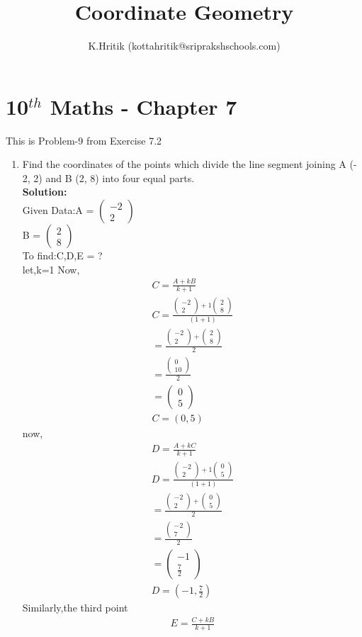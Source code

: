 \documentclass[12pt]{article}
\title{Coordinate Geometry}
\author{K.Hritik (kottahritik@sriprakshschools.com)}
\newcommand{\myvec}[1]{\ensuremath{\begin{pmatrix}#1\end{pmatrix}}}
\newcommand{\solution}{\noindent \textbf{Solution: }}
\begin{document}
\maketitle
\section*{10$^{th}$ Maths - Chapter 7}
This is Problem-9 from Exercise 7.2
\begin{enumerate}
\item Find the coordinates of the points which divide the line segment joining A (- 2, 2) and B (2, 8) into four equal parts.  \\
\solution \\
Given Data:A = \myvec{-2\\2}\\
           B = \myvec{2\\8}\\
To find:C,D,E = ?\\
let,k=1
Now, 
\begin{align}
C = \frac{A+kB}{k+1}\\
C = \frac{\myvec{-2\\2}+1\myvec{2\\8}}{(1+1)}\\
= \frac{\myvec{-2\\2}+\myvec{2\\8}}{2}\\
= \frac{\myvec{0\\10}}{2}\\
 = \myvec{0\\5}\\
C = (0,5)
\end{align}	
now, 
\begin{align}
D = \frac{A+kC}{k+1}\\
D = \frac{\myvec{-2\\2}+1\myvec{0\\5}}{(1+1)}\\
= \frac{\myvec{-2\\2}+\myvec{0\\5}}{2}\\
= \frac{\myvec{-2\\7}}{2}\\
= \myvec{-1\\\frac{7}{2}}\\
D = (-1,\frac{7}{2})
\end{align}
Similarly,the third point 
\begin{align}
E = \frac{C+kB}{k+1}\\

\end{align}
\end{enumerate}
\end{document}
